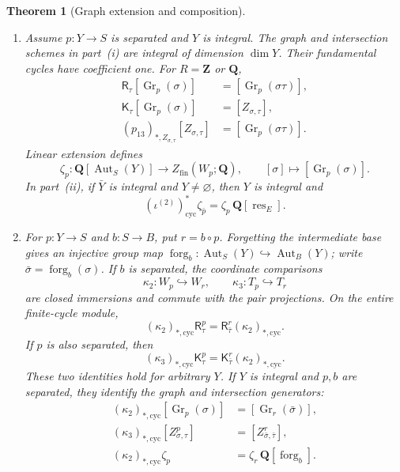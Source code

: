 \documentclass[11pt]{article}
\newtheorem{theorem}{Theorem}[section]
\theoremstyle{definition}
\theoremstyle{remark}
\newcommand{\Q}{\mathbf Q}
\begin{document}
\begin{theorem}[Graph extension and composition]
\begin{enumerate}[label=\textup{(\roman*)},leftmargin=*]
\item
Assume \(p:Y\to S\) is separated and \(Y\) is integral.
The graph and intersection schemes in part~(i) are integral of
dimension \(\dim Y\). Their fundamental cycles have coefficient one.
For \(R=\mathbf Z\) or \(\Q\),
\[
\begin{aligned}
 \mathsf R_\tau[\operatorname{Gr}_p(\sigma)]
   &=[\operatorname{Gr}_p(\sigma\tau)],\\
 \mathsf K_\tau[\operatorname{Gr}_p(\sigma)]
   &=[Z_{\sigma,\tau}],\\
 (p_{13})_{*,Z_{\sigma,\tau}}[Z_{\sigma,\tau}]
   &=[\operatorname{Gr}_p(\sigma\tau)].
\end{aligned}
\]
Linear extension defines
\[
  \zeta_p:\Q[\operatorname{Aut}_S(Y)]
       \longrightarrow Z_{\mathrm{fin}}(W_p;\Q),
  \qquad [\sigma]\longmapsto[\operatorname{Gr}_p(\sigma)].
\]
In part~(ii), if \(\bar Y\) is integral and \(Y\ne\varnothing\),
then \(Y\) is integral and
\[
  (\iota^{(2)})^*_{\mathrm{cyc}}\zeta_{\bar p}
    =\zeta_p\,\Q[\operatorname{res}_E].
\]

\item
For \(p:Y\to S\) and \(b:S\to B\), put \(r=b\circ p\).
Forgetting the intermediate base gives an injective group map
\(\operatorname{forg}_b:\operatorname{Aut}_S(Y)
\hookrightarrow\operatorname{Aut}_B(Y)\); write
\(\bar\sigma=\operatorname{forg}_b(\sigma)\).
If \(b\) is separated, the coordinate comparisons
\[
  \kappa_2:W_p\hookrightarrow W_r,\qquad
  \kappa_3:T_p\hookrightarrow T_r
\]
are closed immersions and commute with the pair projections.
On the entire finite-cycle module,
\[
  (\kappa_2)_{*,\mathrm{cyc}}\mathsf R_\tau^p
    =\mathsf R_{\bar\tau}^r(\kappa_2)_{*,\mathrm{cyc}}.
\]
If \(p\) is also separated, then
\[
  (\kappa_3)_{*,\mathrm{cyc}}\mathsf K_\tau^p
    =\mathsf K_{\bar\tau}^r(\kappa_2)_{*,\mathrm{cyc}}.
\]
These two identities hold for arbitrary \(Y\).
If \(Y\) is integral and \(p,b\) are separated, they identify
the graph and intersection generators:
\[
\begin{aligned}
 (\kappa_2)_{*,\mathrm{cyc}}[\operatorname{Gr}_p(\sigma)]
   &=[\operatorname{Gr}_r(\bar\sigma)],\\
 (\kappa_3)_{*,\mathrm{cyc}}[Z^p_{\sigma,\tau}]
   &=[Z^r_{\bar\sigma,\bar\tau}],\\
 (\kappa_2)_{*,\mathrm{cyc}}\zeta_p
   &=\zeta_r\,\Q[\operatorname{forg}_b].
\end{aligned}
\]
\end{enumerate}
\end{theorem}
\end{document}
